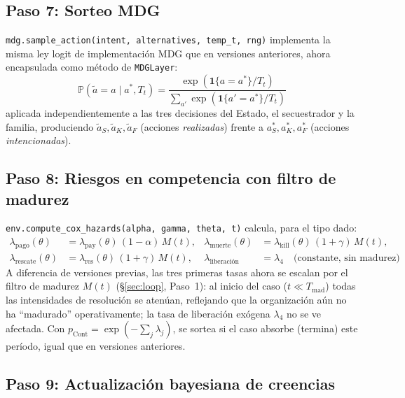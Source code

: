 \documentclass[ecta,nameyear,draft]{econsocart}
\newcommand{\pyvar}[1]{\texttt{#1}}
\begin{document}
\subsection{Paso 7: Sorteo MDG}

\pyvar{mdg.sample\_action(\allowbreak intent, alternatives, temp\_t, rng)} implementa la misma ley logit
de implementación MDG que en versiones anteriores, ahora encapsulada como método de
\pyvar{MDGLayer}:
\begin{equation}
\mathbb{P}(\tilde{a}=a \mid a^\ast, T_t) = \frac{\exp(\mathbf{1}\{a=a^\ast\}/T_t)}{\sum_{a'} \exp(\mathbf{1}\{a'=a^\ast\}/T_t)}
\end{equation}
aplicada independientemente a las tres decisiones del Estado, el secuestrador y la familia,
produciendo $\tilde{a}_S, \tilde{a}_K, \tilde{a}_F$ (acciones \emph{realizadas}) frente a
$a_S^\ast, a_K^\ast, a_F^\ast$ (acciones \emph{intencionadas}).

\subsection{Paso 8: Riesgos en competencia con filtro de madurez}

\pyvar{env.compute\_cox\_hazards(\allowbreak alpha, gamma, theta, t)} calcula, para el tipo dado:
\begin{align}
\lambda_{\mathrm{pago}}(\theta) &= \lambda_{\mathrm{pay}}(\theta)\,(1-\alpha)\,M(t), &
\lambda_{\mathrm{muerte}}(\theta) &= \lambda_{\mathrm{kill}}(\theta)\,(1+\gamma)\,M(t), \\
\lambda_{\mathrm{rescate}}(\theta) &= \lambda_{\mathrm{res}}(\theta)\,(1+\gamma)\,M(t), &
\lambda_{\text{liberación}} &= \lambda_4 \quad \text{(constante, sin madurez)}
\end{align}
A diferencia de versiones previas, las tres primeras tasas ahora se escalan por el filtro de
madurez $M(t)$ (\S\ref{sec:loop}, Paso~1): al inicio del caso ($t \ll T_{\mathrm{mad}}$) todas
las intensidades de resolución se atenúan, reflejando que la organización aún no ha
``madurado'' operativamente; la tasa de liberación exógena $\lambda_4$ no se ve afectada. Con
$p_{\mathrm{Cont}} = \exp(-\sum_j \lambda_j)$, se sortea si el caso absorbe (termina) este
período, igual que en versiones anteriores.

\subsection{Paso 9: Actualización bayesiana de creencias}
\end{document}

